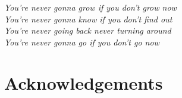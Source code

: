 

\begin{flushright}{\slshape    
You're never gonna grow if you don't grow now \\
You're never gonna know if you don't find out \\
You're never going back never turning around \\
You're never gonna go if you don't go now \\
}
\end{flushright}

\bigskip


\begingroup

\let\clearpage\relax
\let\cleardoublepage\relax
\let\cleardoublepage\relax

\chapter*{Acknowledgements}

\noindent

